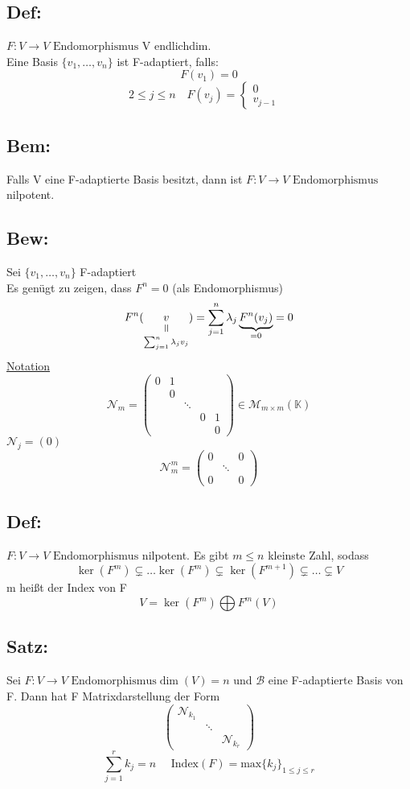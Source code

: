 \documentclass[titlepage,12pt,a4paper,ngerman]{report}
\newcommand{\verteq}{\rotatebox{90}{$\,=$}}
\newcommand{\equalto}[2]{\underset{\scriptstyle\overset{\mkern4mu\verteq}{#2}}{#1}}
\newcommand{\tx}[1]{\textrm{#1}}
\newcommand{\ub}[1]{\underbrace{#1}}
\newcommand{\casess}[4]{\left\{ \begin{array}{ll} {#1} & {#2} \\ {#3} & {#4} \end{array} \right.}
\newcommand{\enph}{F: V \to V \textrm{ Endomorphismus}}
\begin{document}


\subsection{Def:}
$ \enph $ V endlichdim.\\
Eine Basis $ \{v_1,\dots,v_n\} $ ist F-adaptiert, falls:\\
$$F(v_1) = 0$$
$$2\le j \le n \quad F(v_j) = \casess{0}{}{v_{j-1}}{}$$
\subsection{Bem:}
Falls V eine F-adaptierte Basis besitzt, dann ist $ \enph $ nilpotent.
\subsection{Bew:}
Sei $ \{v_1,\dots ,v_n\} $ F-adaptiert\\
Es genügt zu zeigen, dass $ F^n = 0 $ (als Endomorphismus)
$$F^n(\equalto{v}{\sum_{j=1}^{n} \lambda_j v_j}) = \sum_{j=1}^{n} \lambda_j \ub{F^n(v_j)}_{=0} = 0$$
\underline{Notation}
$$ \mathcal{N}_m = \begin{pmatrix}
0 & 1 \\
& 0 \\
& & \ddots \\
& & & 0 & 1\\
& & & & 0 
\end{pmatrix} \in \mathcal{M}_{m\times m} (\mathbb{K})$$
$\mathcal{N} _j = (0) $
$$ \mathcal{N}^m_m = \begin{pmatrix}
0 & & 0 \\
& \ddots \\
0 & & 0
\end{pmatrix}$$
\subsection{Def:}
$ \enph $ nilpotent. Es gibt $ m \le n $ kleinste Zahl, sodass 
$$ \ker(F^m) \subsetneq \dots \ker (F^m) \subsetneq \ker(F^{m+1}) \subsetneq \dots \subsetneq V$$
m heißt der Index von F
$$ V = \ker(F^m) \bigoplus F^m(V)$$
\subsection{Satz:}
Sei $ \enph \dim(V) = n $ und $ \mathcal{B} $ eine F-adaptierte Basis von F. Dann hat F Matrixdarstellung der Form
$$\begin{pmatrix}
\mathcal{N}_{k_1}\\
& \ddots \\
& & \mathcal{N}_{k_r}
\end{pmatrix}$$
$$\sum_{j=1}^{r} k_j = n \quad \tx{ Index} (F) = \tx{max} \{k_j\}_{1 \le j \le r}$$
\end{document}

